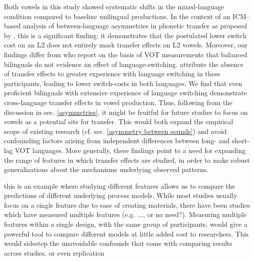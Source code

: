 \documentclass[12 pt]{article}
\begin{document}
Both vowels in this study showed systematic shifts in the mixed-language condition compared to baseline unilingual productions. In the context of an ICM--based analysis of between-language asymmetries in phonetic transfer as proposed by \cite{olson2013bilingual}, this is a significant finding: it demonstrates that the postulated lower switch cost on an L2 does not entirely mask transfer effects on L2 vowels. Moreover, our findings differ from \cite{tsui2019impact} who report on the basis of VOT measurements that balanced bilinguals do not evidence an effect of language-switching. \citeauthor{tsui2019impact} attribute the absence of transfer effects to greater experience with language switching in these participants, leading to lower switch-costs in both languages. We find that even proficient bilinguals with extensive experience of language switching demonstrate cross-language transfer effects in vowel production. Thus, following from the discussion in sec. \ref{asymmetries}, it might be fruitful for future studies to focus on vowels as a potential site for transfer. This would both expand the empirical scope of existing research (cf. sec. \ref{asymmetry between sounds}) and avoid confounding factors arising from independent differences between long- and short-lag VOT languages. More generally, these findings point to a need for expanding the range of features in which transfer effects are studied, in order to make robust generalizations about the mechanisms underlying observed patterns. 

\alert{this is an example where studying different features allows us to compare the predictions of different underlying process models. While most studies usually focus on a single feature due to ease of creating materials, there have been studies which have measured multiple features (e.g. ..., or no need?). Measuring multiple features within a single design, with the same group of participants, would give a powerful tool to compare different models at little added cost to researchers. This would sidestep the unavoidable confounds that come with comparing results across studies, or even replication}
\end{document}

